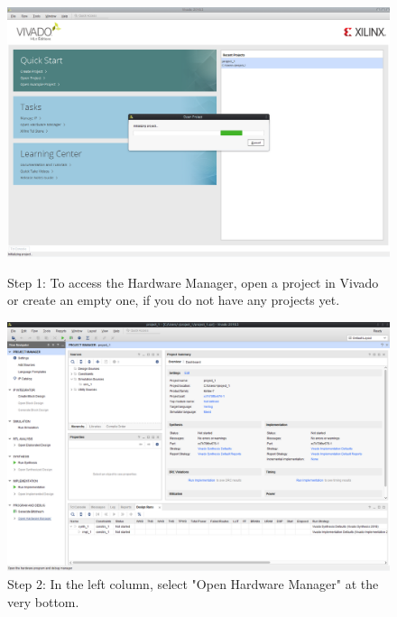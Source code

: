 \begin{figure}[H]
\centering
  \includegraphics[width=0.8\linewidth]{images/vivado01.png}
  \captionsetup{width=0.8\linewidth}
  \caption{Step 1: To access the Hardware Manager, open a project in
           Vivado or create an empty one, if you do not have any projects yet.}
  \label{fig:vivado01}

\vspace{5mm}

\centering
  \includegraphics[width=0.8\linewidth]{images/vivado02.png}
  \captionsetup{width=0.8\linewidth}
  \caption{Step 2: In the left column, select "Open Hardware Manager"
           at the very bottom.}
  \label{fig:vivado02}
\end{figure}


